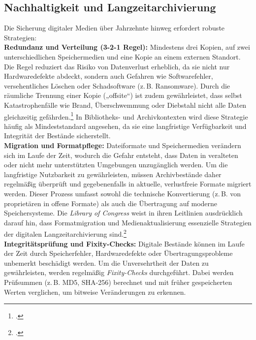 \documentclass[12pt,a4paper]{report}
\begin{document}
\subsection{Nachhaltigkeit und Langzeitarchivierung}  
Die Sicherung digitaler Medien über Jahrzehnte hinweg erfordert robuste Strategien:
\\
\newline
\textbf{Redundanz und Verteilung (3-2-1 Regel):}  
Mindestens drei Kopien, auf zwei unterschiedlichen Speichermedien und eine Kopie an einem externen Standort. 
Die Regel reduziert das Risiko von Datenverlust erheblich, da sie nicht nur Hardwaredefekte abdeckt, sondern auch Gefahren wie Softwarefehler, versehentliches Löschen oder Schadsoftware (z.\,B. Ransomware).
Durch die räumliche Trennung einer Kopie („offsite“) ist zudem gewährleistet, dass selbst Katastrophenfälle wie Brand, Überschwemmung oder Diebstahl nicht alle Daten gleichzeitig gefährden.\footcite[Vgl.][siehe Backupstrategien]{wikipedia_datensicherung}
In Bibliotheks- und Archivkontexten wird diese Strategie häufig als Mindeststandard angesehen, da sie eine langfristige Verfügbarkeit und Integrität der Bestände sicherstellt.  
\\
\newline
\textbf{Migration und Formatpflege:}  
Dateiformate und Speichermedien verändern sich im Laufe der Zeit, wodurch die Gefahr entsteht, dass Daten in veralteten oder nicht mehr unterstützten Umgebungen unzugänglich werden.  
Um die langfristige Nutzbarkeit zu gewährleisten, müssen Archivbestände daher regelmäßig überprüft und gegebenenfalls in aktuelle, verlustfreie Formate migriert werden.  
Dieser Prozess umfasst sowohl die technische Konvertierung (z.\,B. von proprietären in offene Formate) als auch die Übertragung auf moderne Speichersysteme.  
Die \emph{Library of Congress} weist in ihren Leitlinien ausdrücklich darauf hin, dass Formatmigration und Medienaktualisierung essenzielle Strategien der digitalen Langzeitarchivierung sind.\footcite[Vgl.][siehe Sustainability Factors]{loc_formats}  
\\
\newline
\textbf{Integritätsprüfung und Fixity-Checks:}  
Digitale Bestände können im Laufe der Zeit durch Speicherfehler, Hardwaredefekte oder Übertragungsprobleme unbemerkt beschädigt werden.  
Um die Unversehrtheit der Daten zu gewährleisten, werden regelmäßig \emph{Fixity-Checks} durchgeführt.  
Dabei werden Prüfsummen (z.\,B. MD5, SHA-256) berechnet und mit früher gespeicherten Werten verglichen, um bitweise Veränderungen zu erkennen.  
\end{document}
